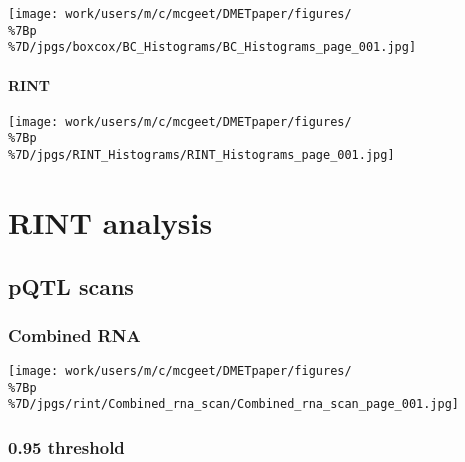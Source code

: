 \documentclass[
  letterpaper,
  DIV=11,
  numbers=noendperiod]{scrreprt}
\begin{document}
\begin{center}
\texttt{[image: work/users/m/c/mcgeet/DMETpaper/figures/\\\%7Bp\\\%7D/jpgs/boxcox/BC\_Histograms/BC\_Histograms\_page\_001.jpg]}
\end{center}

\subsubsection{RINT}\label{rint-1}

\begin{center}
\texttt{[image: work/users/m/c/mcgeet/DMETpaper/figures/\\\%7Bp\\\%7D/jpgs/RINT\_Histograms/RINT\_Histograms\_page\_001.jpg]}
\end{center}


\chapter{RINT analysis}\label{rint-analysis-1}

\section{pQTL scans}\label{pqtl-scans-1}

\subsection{Combined RNA}\label{combined-rna-1}

\begin{center}
\texttt{[image: work/users/m/c/mcgeet/DMETpaper/figures/\\\%7Bp\\\%7D/jpgs/rint/Combined\_rna\_scan/Combined\_rna\_scan\_page\_001.jpg]}
\end{center}

\subsection{0.95 threshold}\label{threshold-2}
\end{document}
